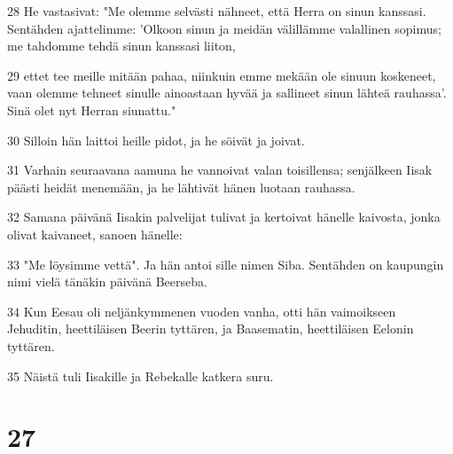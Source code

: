 \par 28 He vastasivat: "Me olemme selvästi nähneet, että Herra on sinun kanssasi. Sentähden ajattelimme: 'Olkoon sinun ja meidän välillämme valallinen sopimus; me tahdomme tehdä sinun kanssasi liiton,
\par 29 ettet tee meille mitään pahaa, niinkuin emme mekään ole sinuun koskeneet, vaan olemme tehneet sinulle ainoastaan hyvää ja sallineet sinun lähteä rauhassa'. Sinä olet nyt Herran siunattu."
\par 30 Silloin hän laittoi heille pidot, ja he söivät ja joivat.
\par 31 Varhain seuraavana aamuna he vannoivat valan toisillensa; senjälkeen Iisak päästi heidät menemään, ja he lähtivät hänen luotaan rauhassa.
\par 32 Samana päivänä Iisakin palvelijat tulivat ja kertoivat hänelle kaivosta, jonka olivat kaivaneet, sanoen hänelle:
\par 33 "Me löysimme vettä". Ja hän antoi sille nimen Siba. Sentähden on kaupungin nimi vielä tänäkin päivänä Beerseba.
\par 34 Kun Eesau oli neljänkymmenen vuoden vanha, otti hän vaimoikseen Jehuditin, heettiläisen Beerin tyttären, ja Baasematin, heettiläisen Eelonin tyttären.
\par 35 Näistä tuli Iisakille ja Rebekalle katkera suru.

\chapter{27}

